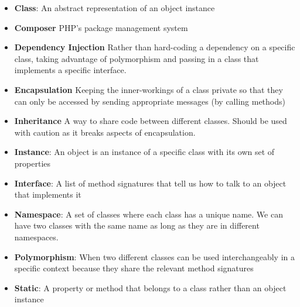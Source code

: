 \begin{itemize}[leftmargin=*]
    \item
        \textbf{Class}:
        An abstract representation of an object instance
    \item
        \textbf{Composer}
        PHP's package management system
    \item
        \textbf{Dependency Injection}
        Rather than hard-coding a dependency on a specific class, taking advantage of polymorphism and passing in a class that implements a specific interface.
    \item
        \textbf{Encapsulation}
        Keeping the inner-workings of a class private so that they can only be accessed by sending appropriate messages (by calling methods)
    \item
        \textbf{Inheritance}
        A way to share code between different classes. Should be used with caution as it breaks aspects of encapsulation.
    \item
        \textbf{Instance}:
        An object is an instance of a specific class with its own set of properties
    \item
        \textbf{Interface}:
        A list of method signatures that tell us how to talk to an object that implements it
    \item
        \textbf{Namespace}:
        A set of classes where each class has a unique name. We can have two classes with the same name as long as they are in different namespaces.
    \item
        \textbf{Polymorphism}:
        When two different classes can be used interchangeably in a specific context because they share the relevant method signatures
    \item
        \textbf{Static}:
        A property or method that belongs to a class rather than an object instance
\end{itemize}

